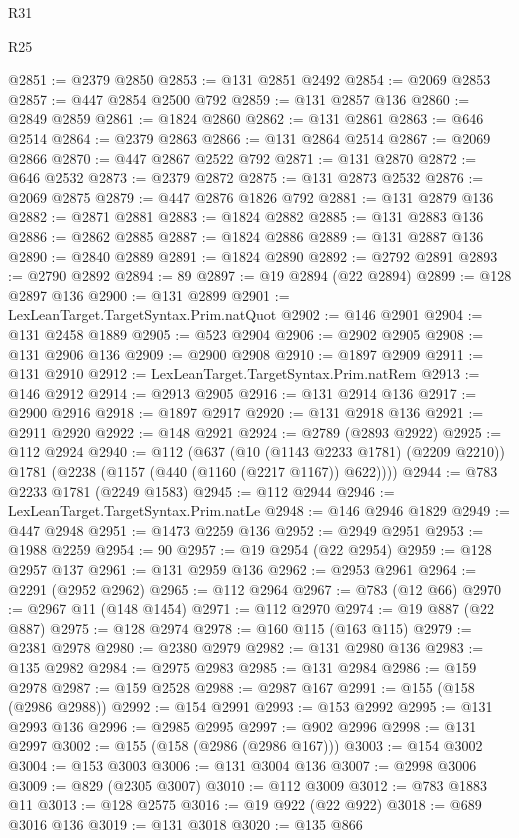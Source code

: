 \begin{lexlean}{R31}
\begin{lexlean}{R25}
\begin{coremodule}
{{{{{{{{{{{{{{{{{{{{{{{{{{{{{{{{{{{{{{{{{{{{{{{{{{{{{{{{{{{{{{{{{{{{{{{{{{{{{{{{{{{{{{{{{{{{{{{{{{{{{{{{{{{{{{{{{{{{{{{{{{{{{{{{{{{{{{{{{{{{{{{{{{{{{{{{{{{{{{{{{{{{{{{{{{{{{{{{{{{{{{{{{{{{{{{{{{{{{{{@2851 := @2379 @2850
@2853 := @131 @2851 @2492
@2854 := @2069 @2853
@2857 := @447 @2854 @2500 @792
@2859 := @131 @2857 @136
@2860 := @2849 @2859
@2861 := @1824 @2860
@2862 := @131 @2861
@2863 := @646 @2514
@2864 := @2379 @2863
@2866 := @131 @2864 @2514
@2867 := @2069 @2866
@2870 := @447 @2867 @2522 @792
@2871 := @131 @2870
@2872 := @646 @2532
@2873 := @2379 @2872
@2875 := @131 @2873 @2532
@2876 := @2069 @2875
@2879 := @447 @2876 @1826 @792
@2881 := @131 @2879 @136
@2882 := @2871 @2881
@2883 := @1824 @2882
@2885 := @131 @2883 @136
@2886 := @2862 @2885
@2887 := @1824 @2886
@2889 := @131 @2887 @136
@2890 := @2840 @2889
@2891 := @1824 @2890
@2892 := @2792 @2891
@2893 := @2790 @2892
@2894 := 89
@2897 := @19 @2894 (@22 @2894)
@2899 := @128 @2897 @136
@2900 := @131 @2899
@2901 := LexLeanTarget.TargetSyntax.Prim.natQuot
@2902 := @146 @2901
@2904 := @131 @2458 @1889
@2905 := @523 @2904
@2906 := @2902 @2905
@2908 := @131 @2906 @136
@2909 := @2900 @2908
@2910 := @1897 @2909
@2911 := @131 @2910
@2912 := LexLeanTarget.TargetSyntax.Prim.natRem
@2913 := @146 @2912
@2914 := @2913 @2905
@2916 := @131 @2914 @136
@2917 := @2900 @2916
@2918 := @1897 @2917
@2920 := @131 @2918 @136
@2921 := @2911 @2920
@2922 := @148 @2921
@2924 := @2789 (@2893 @2922)
@2925 := @112 @2924
@2940 := @112
    (@637
      (@10 (@1143 @2233 @1781) (@2209 @2210))
      @1781
      (@2238 (@1157 (@440 (@1160 (@2217 @1167)) @622))))
@2944 := @783 @2233 @1781 (@2249 @1583)
@2945 := @112 @2944
@2946 := LexLeanTarget.TargetSyntax.Prim.natLe
@2948 := @146 @2946 @1829
@2949 := @447 @2948
@2951 := @1473 @2259 @136
@2952 := @2949 @2951
@2953 := @1988 @2259
@2954 := 90
@2957 := @19 @2954 (@22 @2954)
@2959 := @128 @2957 @137
@2961 := @131 @2959 @136
@2962 := @2953 @2961
@2964 := @2291 (@2952 @2962)
@2965 := @112 @2964
@2967 := @783 (@12 @66)
@2970 := @2967 @11 (@148 @1454)
@2971 := @112 @2970
@2974 := @19 @887 (@22 @887)
@2975 := @128 @2974
@2978 := @160 @115 (@163 @115)
@2979 := @2381 @2978
@2980 := @2380 @2979
@2982 := @131 @2980 @136
@2983 := @135 @2982
@2984 := @2975 @2983
@2985 := @131 @2984
@2986 := @159 @2978
@2987 := @159 @2528
@2988 := @2987 @167
@2991 := @155 (@158 (@2986 @2988))
@2992 := @154 @2991
@2993 := @153 @2992
@2995 := @131 @2993 @136
@2996 := @2985 @2995
@2997 := @902 @2996
@2998 := @131 @2997
@3002 := @155 (@158 (@2986 (@2986 @167)))
@3003 := @154 @3002
@3004 := @153 @3003
@3006 := @131 @3004 @136
@3007 := @2998 @3006
@3009 := @829 (@2305 @3007)
@3010 := @112 @3009
@3012 := @783 @1883 @11
@3013 := @128 @2575
@3016 := @19 @922 (@22 @922)
@3018 := @689 @3016 @136
@3019 := @131 @3018
@3020 := @135 @866
}}}}}}}}}}}}}}}}}}}}}}}}}}}}}}}}}}}}}}}}}}}}}}}}}}}}}}}}}}}}}}}}}}}}}}}}}}}}}}}}}}}}}}}}}}}}}}}}}}}}}}}}}}}}}}}}}}}}}}}}}}}}}}}}}}}}}}}}}}}}}}}}}}}}}}}}}}}}}}}}}}}}}}}}}}}}}}}}}}}}}}}}}}}}}}}}}}}}}}}
\end{coremodule}
\end{lexlean}
\end{lexlean}
